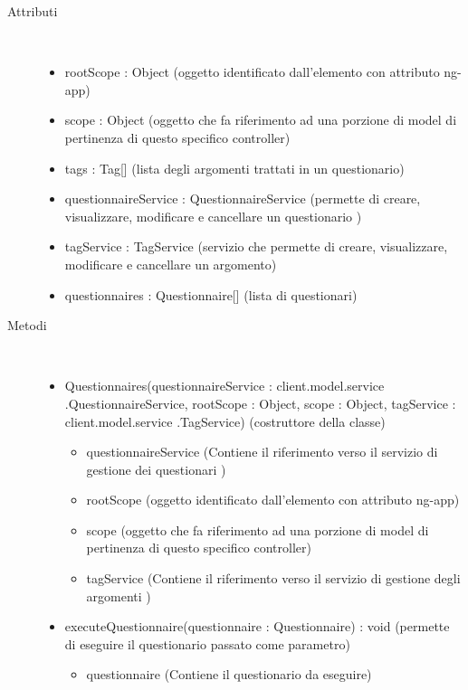 \begin{description}
\item[Attributi] \hfill \\
 \vspace{-7mm}
\begin{itemize}
\item rootScope : Object (oggetto identificato dall’elemento con attributo ng-app)
\item scope : Object (oggetto che fa riferimento ad una porzione di model di pertinenza di questo specifico controller)
\item tags : Tag[] (lista degli argomenti trattati in un questionario)
\item questionnaireService : QuestionnaireService (permette di creare, visualizzare, modificare e cancellare un questionario )
\item tagService : TagService (servizio che permette di creare, visualizzare, modificare e cancellare un argomento)
\item questionnaires  : Questionnaire[] (lista di questionari)
\end{itemize}

\item[Metodi] \hfill \\
 \vspace{-7mm}
\begin{itemize}
\item Questionnaires(questionnaireService : client.model.service .QuestionnaireService, rootScope : Object, scope : Object, tagService : client.model.service .TagService) (costruttore della classe)\begin{itemize}
\item questionnaireService (Contiene il riferimento verso il servizio di gestione dei questionari )
\item rootScope (oggetto identificato dall’elemento con attributo ng-app)
\item scope (oggetto che fa riferimento ad una porzione di model di pertinenza di questo specifico controller)
\item tagService (Contiene il riferimento verso il servizio di gestione degli argomenti )
\end{itemize}

\item executeQuestionnaire(questionnaire : Questionnaire) : void (permette di eseguire il questionario passato come parametro)\begin{itemize}
\item questionnaire (Contiene il questionario da eseguire)
\end{itemize}


\end{itemize}
\end{description}
